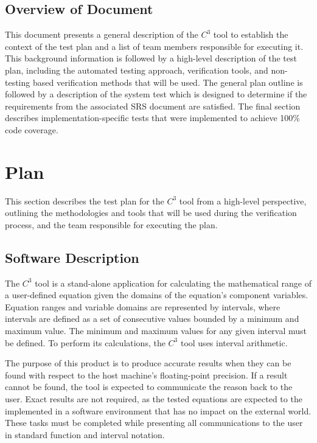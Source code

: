 \documentclass[12pt, titlepage]{article}
\newcommand{\prognameAbbrv}{$C^{3}$}
\begin{document}
\subsection{Overview of Document}
This document presents a general description of the \prognameAbbrv{} tool to 
establish the context of the test plan and a list of team members responsible 
for executing it. This background information is followed by a high-level 
description of the test plan, including the automated testing approach, 
verification tools, and non-testing based verification methods that will be 
used. The general plan outline is followed by a description of the system test 
which is designed to determine if the requirements from the associated SRS 
document are satisfied. The final section describes implementation-specific 
tests that were implemented to achieve 100\% code coverage.

\newpage

\section{Plan}
\label{testplan_highlevel}
This section describes the test plan for the \prognameAbbrv{} tool from a 
high-level perspective, outlining the methodologies and tools that will be used 
during the verification process, and the team responsible for executing the 
plan.
	
\subsection{Software Description}
The \prognameAbbrv{} tool is a stand-alone application for calculating
the mathematical range of a user-defined equation given the domains of
the equation's component variables. Equation ranges and variable
domains are represented by intervals, where intervals are defined as a
set of consecutive values bounded by a minimum and maximum value. The
minimum and maximum values for any given interval must be defined. To
perform its calculations, the \prognameAbbrv{} tool uses interval
arithmetic.

The purpose of this product is to produce accurate results when they can be 
found with respect to the host machine's floating-point precision. If a result 
cannot be found, the tool is expected to communicate the reason back to the 
user. Exact results are not required, as the tested equations are expected to 
the implemented in a software environment that has no impact on the external 
world. These tasks must be completed while presenting all communications to the 
user in standard function and interval notation.
\end{document}
